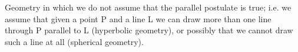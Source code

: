 Geometry in which we do not assume that the parallel postulate is true; i.e.
we assume that given a point P and a line L we can draw more than one line
through P parallel to L (hyperbolic geometry), or possibly that we cannot 
draw such a line at all (spherical geometry).